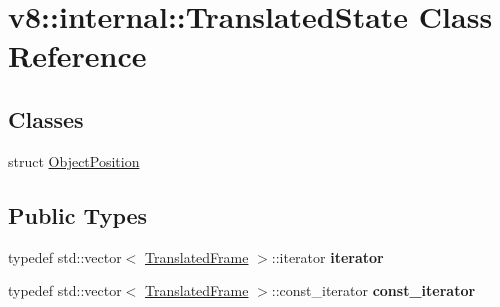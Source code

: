 \hypertarget{classv8_1_1internal_1_1_translated_state}{}\section{v8\+:\+:internal\+:\+:Translated\+State Class Reference}
\label{classv8_1_1internal_1_1_translated_state}
\subsection*{Classes}
\begin{DoxyCompactItemize}
\item 
struct \hyperlink{structv8_1_1internal_1_1_translated_state_1_1_object_position}{Object\+Position}
\end{DoxyCompactItemize}
\subsection*{Public Types}
\begin{DoxyCompactItemize}
\item 
typedef std\+::vector$<$ \hyperlink{classv8_1_1internal_1_1_translated_frame}{Translated\+Frame} $>$\+::iterator {\bfseries iterator}\hypertarget{classv8_1_1internal_1_1_translated_state_a153eb09bc74719d6fb259982cf8fcdc2}{}\label{classv8_1_1internal_1_1_translated_state_a153eb09bc74719d6fb259982cf8fcdc2}

\item 
typedef std\+::vector$<$ \hyperlink{classv8_1_1internal_1_1_translated_frame}{Translated\+Frame} $>$\+::const\+\_\+iterator {\bfseries const\+\_\+iterator}\hypertarget{classv8_1_1internal_1_1_translated_state_a26e186a96d8e29d5738e3a0b38fd3d37}{}\label{classv8_1_1internal_1_1_translated_state_a26e186a96d8e29d5738e3a0b38fd3d37}

\end{DoxyCompactItemize}

